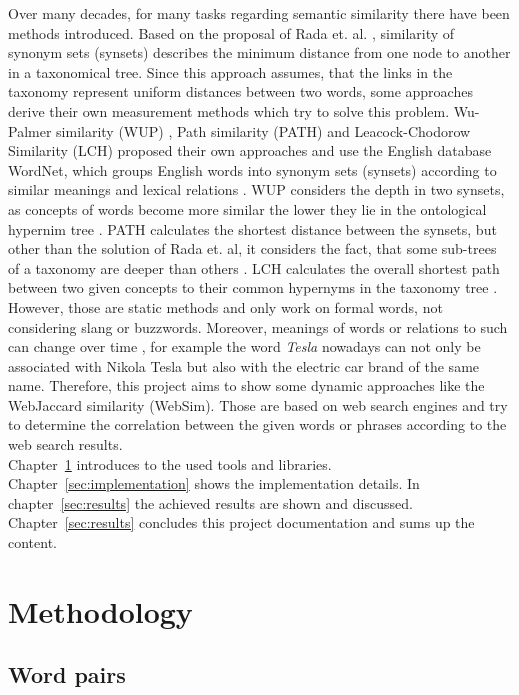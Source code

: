 \documentclass[conference]{IEEEtran}
\begin{document}
Over many decades, for many tasks regarding semantic similarity there have been methods introduced. Based on the proposal of Rada et. al. \cite{rada89}, similarity of synonym sets (synsets) describes the minimum distance from one node to another in a taxonomical tree. Since this approach assumes, that the links in the taxonomy represent uniform distances \cite{resnik} between two words, some approaches derive their own measurement methods which try to solve this problem. Wu-Palmer similarity (WUP) \cite{wupalmer}, Path similarity (PATH) \cite{resnik} and Leacock-Chodorow Similarity (LCH) \cite{lch} proposed their own approaches and use the English database WordNet, which groups English words into synonym sets (synsets) according to similar meanings and lexical relations \cite{wordnet}. WUP considers the depth in two synsets, as concepts of words become more similar the lower they lie in the ontological hypernim tree \cite{wupmod}. PATH calculates the shortest distance between the synsets, but other than the solution of Rada et. al, it considers the fact, that some sub-trees of a taxonomy are deeper than others \cite{resnik}. LCH calculates the overall shortest path between two given concepts \cite{slimani} to their common hypernyms in the taxonomy tree \cite{perkins}.\\
However, those are static methods and only work on formal words, not considering slang or buzzwords. Moreover, meanings of words or relations to such can change over time \cite{websim}, for example the word \textit{Tesla} nowadays can not only be associated with Nikola Tesla but also with the electric car brand of the same name. Therefore, this project aims to show some dynamic approaches like the WebJaccard similarity (WebSim). Those are based on web search engines and try to determine the correlation between the given words or phrases according to the web search results.\\
Chapter~\ref{sec:methodology} introduces to the used tools and libraries. Chapter~\ref{sec:implementation} shows the implementation details. In chapter~\ref{sec:results} the achieved results are shown and discussed.  Chapter~\ref{sec:results} concludes this project documentation and sums up the content.

\section{Methodology}\label{sec:methodology}

\subsection{Word pairs}
\end{document}
